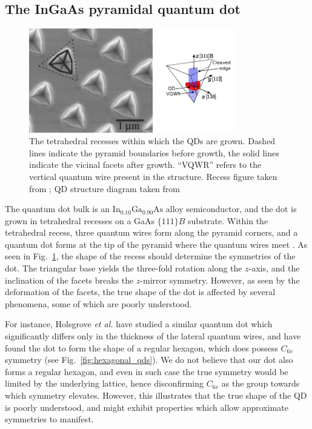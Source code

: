 \documentclass[12pt]{article}
\numberwithin{equation}{section}
\begin{document}
\subsection{The InGaAs pyramidal quantum dot} \label{sec:growth}
\begin{figure}
\begin{center}

    \includegraphics[width=0.8\textwidth]{figures/pyramidal_qds}
 \caption{The tetrahedral recesses within which the QDs are grown. Dashed lines indicate the pyramid boundaries before growth, the solid lines indicate the vicinal facets after growth. ``VQWR'' refers to the vertical quantum wire present in the structure. Recess figure taken from \cite[Fig.~1]{pyramidal_qds}; QD structure diagram taken from \cite[Fig.~1]{karlsson}\label{fig:pyramidal_qds}}
\end{center}
\end{figure}

The quantum dot bulk is an $\text{In}_{0.10}\text{Ga}_{0.90}\text{As}$ alloy semiconductor, and the dot is grown in tetrahedral recesses on a GaAs $\{111\}B$ substrate. Within the tetrahedral recess, three quantum wires form along the pyramid corners, and a quantum dot forms at the tip of the pyramid where the quantum wires meet \cite{pyramidal_qds}. As seen in Fig.~\ref{fig:pyramidal_qds}, the shape of the recess should determine the symmetries of the dot. The triangular base yields the three-fold rotation along the $z$-axis, and the inclination of the facets breaks the $z$-mirror symmetry. However, as seen by the deformation of the facets, the true shape of the dot is affected by several phenomena, some of which are poorly understood.

For instance, Holsgrove \textit{et al.} have studied a similar quantum dot which significantly differs only in the thickness of the lateral quantum wires, and have found the dot to form the shape of a regular hexagon, which does possess $C_{6v}$ symmetry \cite{hexagon} (see Fig.~\ref{fig:hexagonal_qds}). We do not believe that our dot also forms a regular hexagon, and even in such case the true symmetry would be limited by the underlying lattice, hence disconfirming $C_{6v}$ as the group towards which symmetry elevates. However, this illustrates that the true shape of the QD is poorly understood, and might exhibit properties which allow approximate symmetries to manifest.
\end{document}
